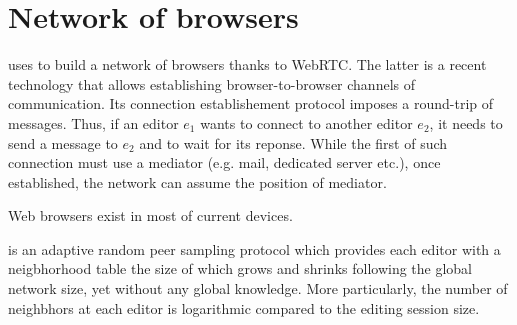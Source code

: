 
\section{Network of browsers}
\label{sec:network}

\CRATE uses \SPRAY to build a network of browsers thanks to WebRTC. The latter
is a recent technology that allows establishing browser-to-browser channels of
communication. Its connection establishement protocol imposes a round-trip of
messages. Thus, if an editor $e_1$ wants to connect to another editor $e_2$, it
needs to send a message to $e_2$ and to wait for its reponse. While the first of
such connection must use a mediator (e.g. mail, dedicated server etc.), once
established, the network can assume the position of mediator.

Web browsers exist in most of current devices. 

\SPRAY is an adaptive random peer sampling protocol which provides each editor
with a neigbhorhood table the size of which grows and shrinks following the
global network size, yet without any global knowledge. More particularly, the
number of neighbhors at each editor is logarithmic compared to the editing
session size.

